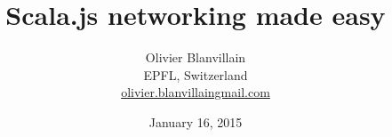 \documentclass[12pt]{article}
\title{Scala.js networking made easy}
\author{
  Olivier Blanvillain\\
  EPFL, Switzerland\\
  \href{mailto:olivier.blanvillain@gmail.com}{olivier.blanvillain{\at}gmail.com}
}
\date{January 16, 2015}
\begin{document}
  

  \maketitle

  \begin{abstract}
    
  \end{abstract}

  

  
  
\end{document}

